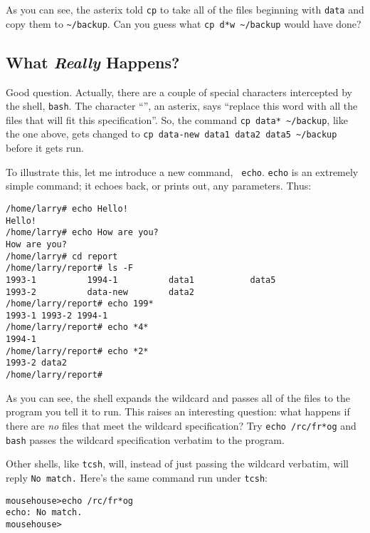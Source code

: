 As you can see, the asterix told {\tt cp} to take all of the files
beginning with {\tt data} and copy them to {\tt \verb+~+/backup}. Can you guess
what {\tt cp d*w \verb+~+/backup} would have done?

\subsection{What {\em Really\/} Happens?}

Good question. Actually, there are a couple of special characters
intercepted by the shell, {\tt bash}. The character
``{\tt *}'', an asterix, says ``replace this word with all the files
that will fit this specification''. So, the command {\tt cp data*
  \verb+~+/backup}, like the one above, gets changed to {\tt cp
  data-new data1 data2 data5 \verb+~+/backup} before it gets run.

To illustrate this, let me introduce a new command, {\tt
  echo}. {\tt echo} is an extremely simple command;
it echoes back, or prints out, any parameters. Thus:

\begin{screen}\begin{verbatim}
/home/larry# echo Hello!
Hello!
/home/larry# echo How are you?
How are you?
/home/larry# cd report
/home/larry/report# ls -F
1993-1          1994-1          data1           data5
1993-2          data-new        data2
/home/larry/report# echo 199*
1993-1 1993-2 1994-1
/home/larry/report# echo *4*
1994-1
/home/larry/report# echo *2*
1993-2 data2
/home/larry/report#
\end{verbatim}
\end{screen}

As you can see, the shell expands the wildcard and passes all of the
files to the program you tell it to run. This raises an interesting
question: what happens if there are {\em no\/} files that meet the
wildcard specification? Try {\tt echo /rc/fr*og} and {\tt
  bash} passes the wildcard specification verbatim to
the program.

Other shells, like {\tt tcsh}, will, instead of just
passing the wildcard verbatim, will reply {\tt No match.} Here's the
same command run under {\tt tcsh}:

\begin{screen}\begin{verbatim}
mousehouse>echo /rc/fr*og
echo: No match.
mousehouse>
\end{verbatim}\end{screen}

